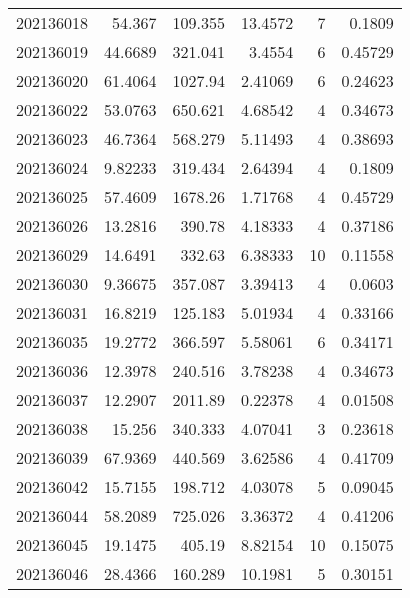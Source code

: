 \begin{tabular}{rrrrrr}
 202136018 &         54.367   &      109.355  &           13.4572  &           7 & 0.1809  \\
 202136019 &         44.6689  &      321.041  &            3.4554  &           6 & 0.45729 \\
 202136020 &         61.4064  &     1027.94   &            2.41069 &           6 & 0.24623 \\
 202136022 &         53.0763  &      650.621  &            4.68542 &           4 & 0.34673 \\
 202136023 &         46.7364  &      568.279  &            5.11493 &           4 & 0.38693 \\
 202136024 &          9.82233 &      319.434  &            2.64394 &           4 & 0.1809  \\
 202136025 &         57.4609  &     1678.26   &            1.71768 &           4 & 0.45729 \\
 202136026 &         13.2816  &      390.78   &            4.18333 &           4 & 0.37186 \\
 202136029 &         14.6491  &      332.63   &            6.38333 &          10 & 0.11558 \\
 202136030 &          9.36675 &      357.087  &            3.39413 &           4 & 0.0603  \\
 202136031 &         16.8219  &      125.183  &            5.01934 &           4 & 0.33166 \\
 202136035 &         19.2772  &      366.597  &            5.58061 &           6 & 0.34171 \\
 202136036 &         12.3978  &      240.516  &            3.78238 &           4 & 0.34673 \\
 202136037 &         12.2907  &     2011.89   &            0.22378 &           4 & 0.01508 \\
 202136038 &         15.256   &      340.333  &            4.07041 &           3 & 0.23618 \\
 202136039 &         67.9369  &      440.569  &            3.62586 &           4 & 0.41709 \\
 202136042 &         15.7155  &      198.712  &            4.03078 &           5 & 0.09045 \\
 202136044 &         58.2089  &      725.026  &            3.36372 &           4 & 0.41206 \\
 202136045 &         19.1475  &      405.19   &            8.82154 &          10 & 0.15075 \\
 202136046 &         28.4366  &      160.289  &           10.1981  &           5 & 0.30151 \\

\end{tabular}
